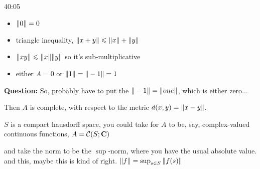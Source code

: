 \begin{example}
\begin{unfinished}{40:05}
\begin{itemize}
\item $\| 0 \| = 0$
\item triangle inequality, $\| x + y \| \leqslant \| x \| + \| y \|$
\item $\| xy \| \leqslant \| x \| \| y \|$ so it's sub-multiplicative
\item either $A = 0$ or $\| 1 \| = \| -1 \| = 1$
\end{itemize}

\textbf{Question:} So, probably have to put the $\| -1 \| = \| one \|$, which is either zero...


Then $A$ is complete, with respect to the metric $d(x,y) = \| x-y \|$. 

\begin{example}
$S$ is a compact hausdorff space, you could take for $A$ to be, say, complex-valued continuous functions,
$A = \mathcal{C}(S; \mathbf C)$

and take the norm to be the $\sup$-norm, where you have the usual absolute value. 
and this, maybe this is kind of right. 
$\| f \| = \sup_{s \in S} \| f(s) \|$

\end{example}
 
\end{unfinished}
\end{example}
